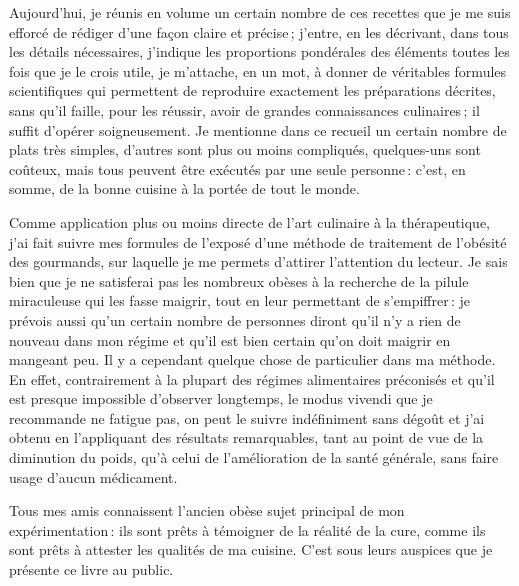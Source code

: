 \begin{itshape}
Aujourd'hui, je réunis en volume un certain nombre de ces recettes que je me suis
efforcé de rédiger d'une façon claire et précise ; j'entre, en les décrivant, dans tous
les détails nécessaires, j'indique les proportions pondérales des éléments toutes les
fois que je le crois utile, je m'attache, en un mot, à donner de véritables formules
scientifiques qui permettent de reproduire exactement les préparations décrites, sans
qu'il faille, pour les réussir, avoir de grandes connaissances culinaires ; il suffit
d'opérer soigneusement. Je mentionne dans ce recueil un certain nombre de plats très
simples, d'autres sont plus ou moins compliqués, quelques-uns sont coûteux, mais
tous peuvent être exécutés par une seule personne : c'est, en somme, de la bonne cuisine 
à la portée de tout le monde.

Comme application plus ou moins directe de l'art culinaire à la thérapeutique, j'ai
fait suivre mes formules de l'exposé d'une méthode de traitement de l'obésité des 
gourmands, sur laquelle je me permets d'attirer l'attention du lecteur. Je sais bien que je
ne satisferai pas les nombreux obèses à la recherche de la pilule miraculeuse qui les
fasse maigrir, tout en leur permettant de s'empiffrer : je prévois aussi qu'un certain
nombre de personnes diront qu'il n'y a rien de nouveau dans mon régime et qu'il est
bien certain qu'on doit maigrir en mangeant peu. Il y a cependant quelque chose de
particulier dans ma méthode. En effet, contrairement à la plupart des régimes 
alimentaires préconisés et qu'il est presque impossible d'observer longtemps, le modus
vivendi que je recommande ne fatigue pas, on peut le suivre indéfiniment sans
dégoût et j'ai obtenu en l'appliquant des résultats remarquables, tant au point de vue
de la diminution du poids, qu'à celui de l'amélioration de la santé générale, sans
faire usage d'aucun médicament.

Tous mes amis connaissent l'ancien obèse sujet principal de mon expérimentation :
ils sont prêts à témoigner de la réalité de la cure, comme ils sont prêts à attester les
qualités de ma cuisine. C'est sous leurs auspices que je présente ce livre au public.
\end{itshape}
